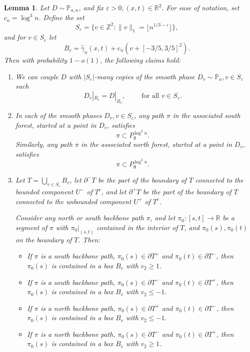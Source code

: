 \documentclass[11pt,twoside]{amsart}
\theoremstyle{plain}
\newtheorem{lem}[thm]{Lemma}
\numberwithin{quest}{section}
\theoremstyle{remark}
\numberwithin{rem}{section}
\theoremstyle{definition}
\newcommand{\eps}{\varepsilon}
\newcommand{\Z}{\mathbb{Z}}
\newcommand{\R}{\mathbb{R}}
\renewcommand{\P}{\mathbb{P}}
\renewcommand{\tt}[1]{{\mathtt{#1}}}
\begin{document}
	\begin{lem}
	\label{L:ring-construction}
	Let $D \sim \P_{a, n}$, and fix $\eps > 0, (x, t) \in \R^2$. For ease of notation, set $c_n = \log^3 n$. Define the set 
	$$
	S_\eps = \{v \in \Z^2 : \|v\|_1 = \lfloor n^{1/3 - \eps} \rfloor\},
	$$
	and for $v \in S_\eps$ let 
	$$
	B_v = \hat \gamma_n(x, t) + c_n(v + [-3/5, 3/5]^2).
	$$
	Then with probability $1 - o(1)$, the following claims hold:
	\begin{enumerate}[label=(\roman*)]
		\item We can couple $D$ with $|S_\eps|$-many copies of the smooth phase $D_v \sim \P_a, v \in S_\eps$ such 
		$$
		D_v|_{B_v} = D|_{B_v}, \qquad \text{ for all } v \in S_\eps.
		$$
		\item In each of the smooth phases $D_v, v \in S_\eps$, any path $\pi$ in the associated south forest, started at a point in $D_v$, satisfies
		$$
		\pi \subset P^{\log^2 n}_\tt{S}.
		$$
		Similarly, any path $\pi$ in the associated north forest, started at a point in $D_v$, satisfies
		$$
		\pi \subset P^{\log^2 n}_\tt{N}.
		$$
		\item Let $T = \bigcup_{v \in S_\eps} B_v$, let $\partial^- T$ be the part of the boundary of $T$ connected to the bounded component $U^-$ of $T^c$, and let $\partial^+ T$ be the part of the boundary of $T$ connected to the unbounded component $U^+$ of $T^c$. 
		
		 Consider any north or south backbone path $\pi$, and let $\pi_0:[s, t] \to \R$ be a segment of $\pi$ with $\pi_0|_{(s, t)}$ contained in the interior of $T$, and $\pi_0(s), \pi_0(t)$ on the boundary of $T$. Then:
		 \begin{itemize}
		 	\item If $\pi$ is a south backbone path, $\pi_0(s) \in \partial T^+$ and $\pi_0(t) \in \partial T^-$, then $\pi_0(s)$ is contained in a box $B_v$ with $v_2 \ge 1$.
		 	\item If $\pi$ is a south backbone path, $\pi_0(s) \in \partial T^-$ and $\pi_0(t) \in \partial T^+$, then $\pi_0(s)$ is contained in a box $B_v$ with $v_2 \le - 1$.
		 	\item If $\pi$ is a north backbone path, $\pi_0(s) \in \partial T^+$ and $\pi_0(t) \in \partial T^-$, then $\pi_0(s)$ is contained in a box $B_v$ with $v_2 \le -1$.
		 	\item If $\pi$ is a north backbone path, $\pi_0(s) \in \partial T^-$ and $\pi_0(t) \in \partial T^+$, then $\pi_0(s)$ is contained in a box $B_v$ with $v_2 \ge 1$.
		 \end{itemize} 
	\end{enumerate}
	\end{lem}
\end{document}
